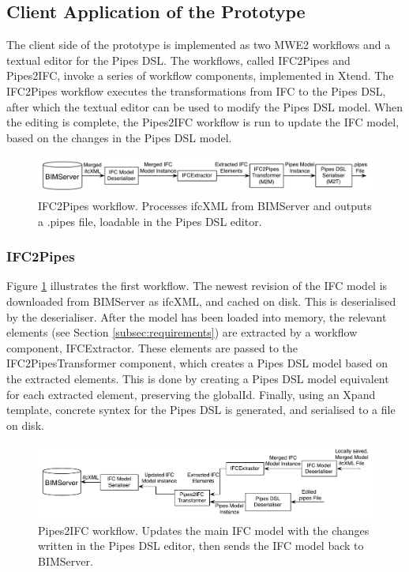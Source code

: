\subsection{Client Application of the Prototype}
The client side of the prototype is implemented as two MWE2 workflows and a textual editor for the Pipes DSL. The workflows, called IFC2Pipes and Pipes2IFC, invoke a series of workflow components, implemented in Xtend. The IFC2Pipes workflow executes the transformations from IFC to the Pipes DSL, after which the textual editor can be used to modify the Pipes DSL model. When the editing is complete, the Pipes2IFC workflow is run to update the IFC model, based on the changes in the Pipes DSL model.

\begin{figure}[H]
    \centering
        \includegraphics[width=114mm]{images/IFC2Pipes.pdf}
    \caption{IFC2Pipes workflow. Processes ifcXML from BIMServer and outputs a .pipes file, loadable in the Pipes DSL editor.}
    \label{fig:IFC2PipesWorkflow}
\end{figure}
\subsubsection{IFC2Pipes}
Figure \ref{fig:IFC2PipesWorkflow} illustrates the first workflow. The newest revision of the IFC model is downloaded from BIMServer as ifcXML, and cached on disk. This is deserialised by the deserialiser. After the model has been loaded into memory, the relevant elements (see Section \ref{subsec:requirements}) are extracted by a workflow component, IFCExtractor. These elements are passed to the IFC2PipesTransformer component, which creates a Pipes DSL model based on the extracted elements. This is done by creating a Pipes DSL model equivalent for each extracted element, preserving the globalId. Finally, using an Xpand template, concrete syntex for the Pipes DSL is generated, and serialised to a file on disk.

\begin{figure}[H]
    \centering
        \includegraphics[width=120mm]{images/Pipes2IFC.pdf}
    \caption{Pipes2IFC workflow. Updates the main IFC model with the changes written in the Pipes DSL editor, then sends the IFC model back to BIMServer.}
    \label{fig:Pipes2IFCWorkflow}
\end{figure}
